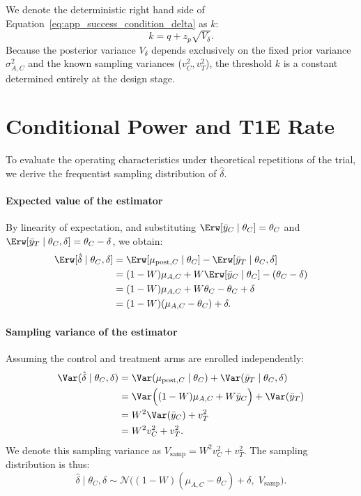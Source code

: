 We denote the deterministic right hand side of Equation~\eqref{eq:app_success_condition_delta} as $k$:
$$
    k = q + z_p \sqrt{V_{\delta}}.
$$
Because the posterior variance $V_{\delta}$ depends exclusively on the fixed prior variance $\sigma_{A,C}^2$ and the known sampling variances ($v_C^2, v_T^2$), the threshold $k$ is a constant determined entirely at the design stage.


\section{Conditional Power and T1E Rate}

To evaluate the operating characteristics under theoretical repetitions of the trial, we derive the frequentist sampling distribution of $\hat{\delta}$.

\paragraph{Expected value of the estimator}
By linearity of expectation, and substituting $\Erw[\bar{y}_C \mid \theta_C] = \theta_C$ and $\Erw[\bar{y}_T \mid \theta_C, \delta] = \theta_C - \delta$, we obtain:
\begin{align}
    \Erw[\hat{\delta} \mid \theta_C, \delta] &= \Erw[\mu_{\text{post},C} \mid \theta_C] - \Erw[\bar{y}_T \mid \theta_C, \delta] \nonumber \\
    &= (1 - W)\mu_{A,C} + W \Erw[\bar{y}_C \mid \theta_C] - (\theta_C - \delta) \nonumber \\
    &= (1 - W)\mu_{A,C} + W\theta_C - \theta_C + \delta \nonumber \\
    &= (1 - W)(\mu_{A,C} - \theta_C) + \delta. \label{eq:app_expected_delta}
\end{align}

\paragraph{Sampling variance of the estimator}
Assuming the control and treatment arms are enrolled independently:
\begin{align}
    \Var(\hat{\delta} \mid \theta_C, \delta) &= \Var(\mu_{\text{post},C} \mid \theta_C) + \Var(\bar{y}_T \mid \theta_C, \delta) \nonumber \\
    &= \Var\Big((1 - W)\mu_{A,C} + W\bar{y}_C\Big) + \Var(\bar{y}_T) \nonumber \\
    &= W^2 \Var(\bar{y}_C) + v_T^2 \nonumber \\
    &= W^2 v_C^2 + v_T^2. \label{eq:app_variance_delta}
\end{align}
We denote this sampling variance as $V_{\text{samp}} = W^2 v_C^2 + v_T^2$. The sampling distribution is thus:
$$
    \hat{\delta} \mid \theta_C, \delta \sim \mathcal{N}\Big( (1 - W)(\mu_{A,C} - \theta_C) + \delta, \; V_{\text{samp}} \Big).
$$

